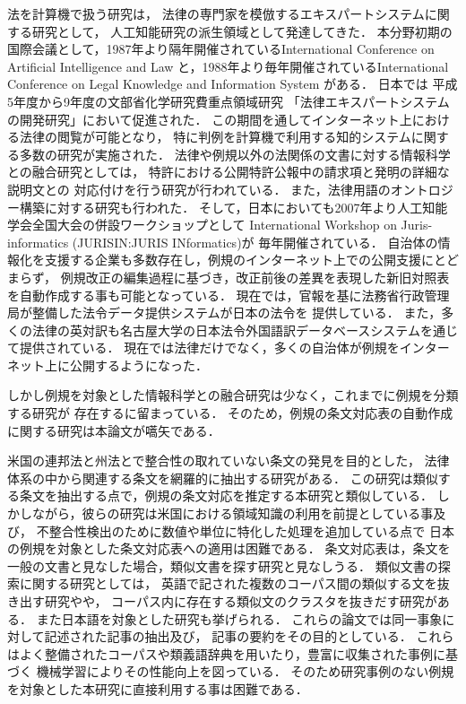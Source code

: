 \documentclass[japanese]{jnlp_1.4}
\begin{document}
法を計算機で扱う研究は，
法律の専門家を模倣するエキスパートシステムに関する研究として，
人工知能研究の派生領域として発達してきた．
本分野初期の国際会議として，1987年より隔年開催されているInternational Conference on Artificial Intelligence and Law \cite{ICAIL}
と，1988年より毎年開催されているInternational Conference on Legal Knowledge and Information System \cite{JURIX}がある．
日本では
平成5年度から9年度の文部省化学研究費重点領域研究
「法律エキスパートシステムの開発研究」において促進された\cite{吉野一}．
この期間を通してインターネット上における法律の閲覧が可能となり，
特に判例を計算機で利用する知的システムに関する多数の研究が実施された．
法律や例規以外の法関係の文書に対する情報科学との融合研究としては，
特許における公開特許公報中の請求項と発明の詳細な説明文との
対応付けを行う研究が行われている\cite{ronbun2-4,ronbun2-2}．
また，法律用語のオントロジー構築に対する研究も行われた\cite{山口高平:1998-03-01}．
そして，日本においても2007年より人工知能学会全国大会の併設ワークショップとして
International Workshop on Juris-informatics (JURISIN:JURIS INformatics)が
毎年開催されている．
自治体の情報化を支援する企業も多数存在し，例規のインターネット上での公開支援にとどまらず，
例規改正の編集過程に基づき，改正前後の差異を表現した新旧対照表を自動作成する事も可能となっている\cite{kakuda}．
現在では，官報を基に法務省行政管理局が整備した法令データ提供システムが日本の法令を
提供している\cite{eGov}．
また，多くの法律の英対訳も名古屋大学の日本法令外国語訳データベースシステムを通じて提供されている\cite{JaLII}．
現在では法律だけでなく，多くの自治体が例規をインターネット上に公開するようになった．



しかし例規を対象とした情報科学との融合研究は少なく，これまでに例規を分類する研究\cite{原田隆史2009}が
存在するに留まっている．
そのため，例規の条文対応表の自動作成に関する研究は本論文が嚆矢である．


米国の連邦法と州法とで整合性の取れていない条文の発見を目的とした，
法律体系の中から関連する条文を網羅的に抽出する研究がある\cite{ronbun3-1}．
この研究は類似する条文を抽出する点で，例規の条文対応を推定する本研究と類似している．
しかしながら，彼らの研究は米国における領域知識の利用を前提としている事及び，
不整合性検出のために数値や単位に特化した処理を追加している点で
日本の例規を対象とした条文対応表への適用は困難である．
条文対応表は，条文を一般の文書と見なした場合，類似文書を探す研究と見なしうる．
類似文書の探索に関する研究としては，
英語で記された複数のコーパス間の類似する文を抜き出す研究や\cite{ronbun1-1}や，
コーパス内に存在する類似文のクラスタを抜きだす研究がある\cite{ronbun1-3}．
また日本語を対象とした研究も挙げられる\cite{ronbun2-1,ronbun2-3}．
これらの論文では同一事象に対して記述された記事の抽出及び，
記事の要約をその目的としている．
これらはよく整備されたコーパスや類義語辞典を用いたり，豊富に収集された事例に基づく
機械学習によりその性能向上を図っている．
そのため研究事例のない例規を対象とした本研究に直接利用する事は困難である．
\end{document}
